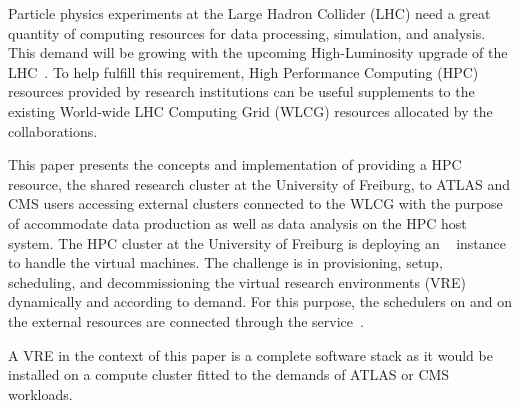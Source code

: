 
Particle physics experiments at the Large Hadron Collider (LHC) need a
great quantity of computing resources for data processing, simulation, and analysis.
This demand will be growing with the upcoming High-Luminosity upgrade of the LHC~\cite{HLLHCcompneeds}.
To help fulfill this requirement, High Performance Computing (HPC) resources provided by research institutions
can be useful supplements to the existing World-wide LHC Computing
Grid (WLCG) resources
allocated by the collaborations.


This paper presents the concepts and implementation of providing a HPC resource, the
shared research cluster \NEMO at the University of Freiburg, to ATLAS and CMS users accessing external clusters connected to the WLCG with the purpose of accommodate data production as well as
data analysis on the HPC host system. The HPC cluster \NEMO at
the University of Freiburg is deploying an \Openstack~\cite{Openstack} instance to handle the
virtual machines. The challenge is in provisioning, setup, scheduling, and decommissioning the virtual research environments (VRE) dynamically and according to demand. For this purpose, the schedulers on \NEMO and on the external resources are
connected through the \Roced service~\cite{ROCED}.

A VRE in the context of this paper is a complete software stack
as it would be installed on a compute cluster fitted to the demands of ATLAS or CMS workloads.
